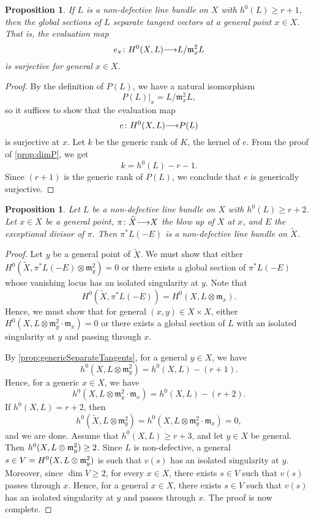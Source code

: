 \documentclass[11pt,reqno]{amsart}
\theoremstyle{plain}
\newtheorem{proposition}[theorem]{Proposition}
\theoremstyle{definition}
\theoremstyle{remark}
\numberwithin{equation}{section}
\renewcommand{\to}{{\longrightarrow}}
\numberwithin{equation}{section}
\begin{document}
\begin{proposition}
  \label{prop:genericSeparateTangents}
  If $L$ is a non-defective line bundle on $X$ with $h^{0}(L) \geq r+1$, then the global sections of $L$ separate tangent vectors at a general point $x \in X$.
  That is, the evaluation map
  \[e_{x}\from H^{0}(X,L) \to L/\mathfrak m_x^2 L\]
  is surjective for general $x \in X$.
\end{proposition}
\begin{proof}
  By the definition of $P(L)$, we have a natural isomorphism
  \[ P(L)|_x = L/\mathfrak m_x^2 L,\]
  so it suffices to show that the evaluation map
  \[ e \from H^0(X,L) \to P(L)\]
  is surjective at $x$.
  Let $k$ be the generic rank of $K$, the kernel of $e$.
  From the proof of \autoref{prop:dimP}, we get
  \[  k = h^0(L) - r - 1.\]
  Since $(r+1)$ is the generic rank of $P(L)$, we conclude that $e$ is generically surjective.
\end{proof}


\begin{proposition}
  \label{prop:blowuppoint}
  Let $L$ be a non-defective line bundle on $X$ with $h^0(L) \geq r+2$.
  Let $x \in X$ be a general point, $\pi \from \widetilde{X} \to X$ the blow up of $X$ at $x$, and $E$ the exceptional divisor of $\pi$.
  Then $\pi^{*}L (-E)$ is a non-defective line bundle on $\widetilde X$.
\end{proposition}

\begin{proof}
  Let $y$ be a general point of $\widetilde X$.
  We must show that either $H^0(\widetilde X, \pi^* L(-E) \otimes \mathfrak m_y^2) = 0$ or there exists a global section of $\pi^*L(-E)$ whose vanishing locus has an isolated singularity at $y$.
  Note that
  \[ H^0(\widetilde X, \pi^*L(-E)) = H^0(X, L \otimes \mathfrak m_x).\]
  Hence, we must show that for general $(x,y) \in X \times X$, either $H^0(X, L \otimes \mathfrak m_y^2 \cdot \mathfrak m_x) = 0$ or there exists a global section of $L$ with an isolated singularity at $y$ and passing through $x$.

  By \autoref{prop:genericSeparateTangents}, for a general $y \in X$, we have
  \[ h^0(X, L \otimes \mathfrak m_y^2) = h^0(X, L) - (r+1).\]
  Hence, for a generic $x \in X$, we have
  \[ h^0(X, L \otimes \mathfrak m_y^2\cdot \mathfrak m_x) = h^0(X, L) - (r+2).\]
  If $h^0(X, L) = r+2$, then
  \[ h^0(\widetilde X, L \otimes \mathfrak m_y^2) = h^0(X, L \otimes \mathfrak m_y^2 \cdot \mathfrak m_x) = 0,\]
  and we are done.
  Assume that $h^0(X, L) \geq r+3$, and let $y \in X$ be general.
  Then $h^0(X, L \otimes \frak m_y^2) \geq 2$.
  Since $L$ is non-defective, a general $s \in V = H^0(X, L \otimes \frak m_y^2)$ is such that $v(s)$ has an isolated singularity at $y$.
  Moreover, since $\dim V \geq 2$, for every $x \in X$, there exists $s \in V$ such that $v(s)$ passes through $x$.
  Hence, for a general $x \in X$, there exists $s \in V$ such that $v(s)$ has an isolated singularity at $y$ and passes through $x$.
  The proof is now complete.
\end{proof}
\end{document}
